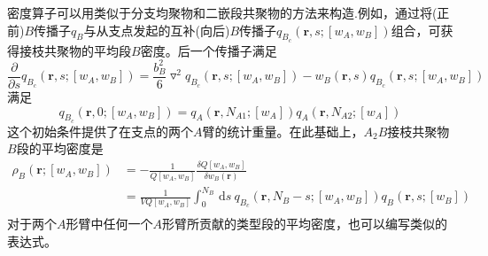 密度算子可以用类似于分支均聚物和二嵌段共聚物的方法来构造.例如，通过将(正前)$B$传播子$q_B$与从支点发起的互补(向后)$B$传播子$q_{B_c}(\mathbf{r},s;[w_A,w_B])$组合，可获得接枝共聚物的平均段$B$密度。后一个传播子满足
\begin{equation}
\frac{\partial}{\partial s}q_{B_c}(\mathbf{r},s;[w_A,w_B])=\frac{b_B^2}{6}\triangledown ^2q_{B_c}(\mathbf{r},s;[w_A,w_B])-w_B(\mathbf{r},s)q_{B_c}(\mathbf{r},s;[w_A,w_B])
\end{equation}
满足
\begin{equation}
q_{B_c}(\mathbf{r},0;[w_A,w_B])=q_A(\mathbf{r},N_{A1};[w_A])q_A(\mathbf{r},N_{A2};[w_A])
\end{equation}
这个初始条件提供了在支点的两个$A$臂的统计重量。在此基础上，$A_2B$接枝共聚物$B$段的平均密度是
\begin{equation}
\begin{aligned}
\rho _B(\mathbf{r};[w_A,w_B]) & =-\frac{1}{Q[w_A,w_B]}	\frac{\delta Q[w_A,w_B]}{\delta w_B(\mathbf{r})} \\
&= \frac{1}{VQ[w_A,w_B]} \int _{0}^{N_B}\,\mathrm{d}s~q_{B_c}(\mathbf{r},N_B-s;[w_A,w_B])q_B(\mathbf{r},s;[w_B]) \\
\end{aligned}	
\end{equation}
对于两个$A$形臂中任何一个$A$形臂所贡献的类型段的平均密度，也可以编写类似的表达式。
